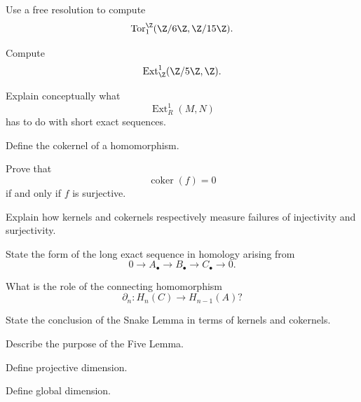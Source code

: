 \begin{exercise}[3]
Use a free resolution to compute
\[ \operatorname{Tor}_1^\Z(\Z/6\Z,\Z/15\Z). \]
\end{exercise}

\begin{exercise}[3]
Compute
\[ \operatorname{Ext}_{\Z}^1(\Z/5\Z,\Z). \]
\end{exercise}

\begin{exercise}[2]
Explain conceptually what
\[ \operatorname{Ext}^1_R(M,N) \]
has to do with short exact sequences.
\end{exercise}

\begin{exercise}[1]
Define the cokernel of a homomorphism.
\end{exercise}

\begin{exercise}[2]
Prove that
\[ \operatorname{coker}(f)=0 \]
if and only if \(f\) is surjective.
\end{exercise}

\begin{exercise}[2]
Explain how kernels and cokernels respectively measure failures of
injectivity and surjectivity.
\end{exercise}

\begin{exercise}[2]
State the form of the long exact sequence in homology arising from
\[ 0\to A_\bullet\to B_\bullet\to C_\bullet\to0. \]
\end{exercise}

\begin{exercise}[1]
What is the role of the connecting homomorphism
\[ \partial_n:H_n(C)\to H_{n-1}(A)? \]
\end{exercise}

\begin{exercise}[2]
State the conclusion of the Snake Lemma in terms of kernels and cokernels.
\end{exercise}

\begin{exercise}[1]
Describe the purpose of the Five Lemma.
\end{exercise}

\begin{exercise}[1]
Define projective dimension.
\end{exercise}

\begin{exercise}[1]
Define global dimension.
\end{exercise}

